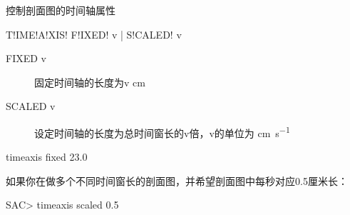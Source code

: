 \label{sss:timeaxis}

控制剖面图的时间轴属性

\begin{SACSTX}
T!IME!A!XIS! F!IXED! v | S!CALED! v
\end{SACSTX}

\begin{description}
\item [FIXED v] 固定时间轴的长度为v \si{\cm}
\item [SCALED v] 设定时间轴的长度为总时间窗长的v倍，v的单位为 \si{\cm\per\s}
\end{description}

\begin{SACDFT}
timeaxis fixed 23.0
\end{SACDFT}

如果你在做多个不同时间窗长的剖面图，并希望剖面图中每秒对应0.5厘米长：
\begin{SACCode}
SAC> timeaxis scaled 0.5
\end{SACCode}
